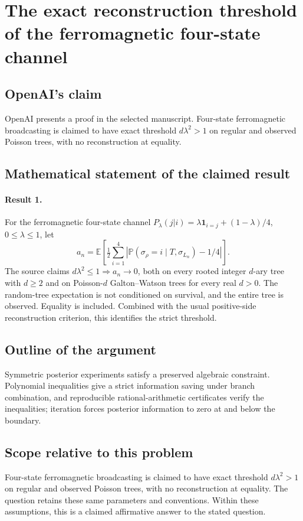 \documentclass[11pt]{article}
\begin{document}
\section*{The exact reconstruction threshold of the ferromagnetic four-state channel}

\subsection{OpenAI's claim}
OpenAI presents a proof in the selected manuscript. Four-state ferromagnetic broadcasting is claimed to have exact threshold $d\lambda^2>1$ on regular and observed Poisson trees, with no reconstruction at equality.

\subsection{Mathematical statement of the claimed result}
\paragraph{Result 1.} For the ferromagnetic four-state channel \(P_\lambda(j|i)=\lambda\mathbf1_{i=j}+(1-\lambda)/4\), \(0\le\lambda\le1\), let
\[
 a_n=\mathbb E\left[\tfrac12\sum_{i=1}^4
 |\mathbb P(\sigma_\rho=i\mid T,\sigma_{L_n})-1/4|\right].
\]
The source claims \(d\lambda^2\le1\Rightarrow a_n\to0\), both on every rooted integer \(d\)-ary tree with \(d\ge2\) and on Poisson-\(d\) Galton--Watson trees for every real \(d>0\). The random-tree expectation is not conditioned on survival, and the entire tree is observed. Equality is included. Combined with the usual positive-side reconstruction criterion, this identifies the strict threshold.

\subsection{Outline of the argument}
Symmetric posterior experiments satisfy a preserved algebraic constraint. Polynomial inequalities give a strict information saving under branch combination, and reproducible rational-arithmetic certificates verify the inequalities; iteration forces posterior information to zero at and below the boundary.

\subsection{Scope relative to this problem}
Four-state ferromagnetic broadcasting is claimed to have exact threshold $d\lambda^2>1$ on regular and observed Poisson trees, with no reconstruction at equality. The question retains these same parameters and conventions. Within these assumptions, this is a claimed affirmative answer to the stated question.
\end{document}
